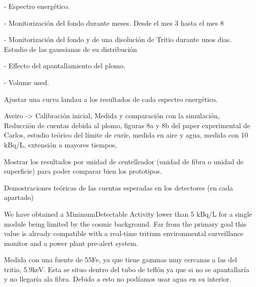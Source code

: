- Espectro energético.

- Monitorización del fondo durante meses. Desde el mes 3 hasta el mes 8

- Monitorización del fondo y de una disolución de Tritio durante unos dias. Estudio de las gaussianas de su distribución 

- Effecto del apantallamiento del plomo.

- Volume used.


Ajustar una curva landau a los resultados de cada espectro energético.

Aveiro -> Calibración inicial, Medida y comparación con la simulación, Reducción de cuentas debida al plomo, figuras 8a y 8b del paper experimental de Carlos, estudio teórico del límite de curíe, medida en aire y agua, medida con 10 kBq/L, extensión a mayores tiempos,

Mostrar los resultados por unidad de centelleador (unidad de fibra o unidad de superficie) para poder comparar bien los prototipos.

Demostraciones teóricas de las cuentas esperadas en los detectores (en cada apartado)





We have obtained a MinimumDetectable Activity lower than 5 kBq/L for a single module being limited by the cosmic background. Far from the primary goal this value is already compatible with a real-time tritium environmental surveillance monitor and a power plant pre-alert system.


Medida con una fuente de 55Fe, ya que tiene gammas muy cercanas a las del tritio, 5.9keV. Esta se situo dentro del tubo de teflón ya que si no se apantallaría y no llegaría  ala fibra. Debido a esto no podíamos usar agua en su interior.


